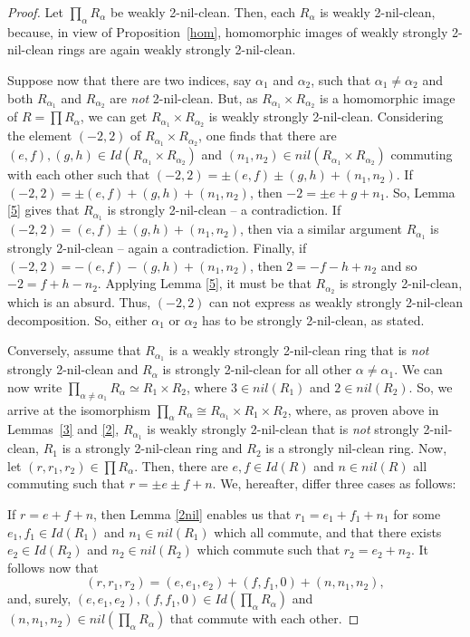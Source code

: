 \documentclass[12pt]{amsart}
\theoremstyle{definition}
\begin{document}
\begin{proof} Let $\prod_{\alpha} R_{\alpha}$ be weakly 2-nil-clean. Then, each $R_{\alpha}$ is weakly 2-nil-clean, because, in view of Proposition~\ref{hom}, homomorphic images of weakly strongly 2-nil-clean rings are again weakly strongly 2-nil-clean.

Suppose now that there are two indices, say $\alpha_1$ and $\alpha_2$, such that $\alpha_1\neq \alpha_2$ and both $R_{\alpha_1}$ and $R_{\alpha_2}$ are {\it not} 2-nil-clean. But, as $R_{\alpha_1}\times R_{\alpha_2}$ is a homomorphic image of $R = \prod R_{\alpha}$, we can get $R_{\alpha_1}\times R_{\alpha_2}$ is weakly strongly 2-nil-clean. Considering the element $(-2,2)$ of $R_{\alpha_1}\times R_{\alpha_2}$, one finds that there are $(e,f),(g,h)\in Id(R_{\alpha_1}\times R_{\alpha_2})$ and $(n_1,n_2)\in nil(R_{\alpha_1}\times R_{\alpha_2})$ commuting with each other such that $(-2,2)=\pm(e,f)\pm (g,h)+(n_1,n_2)$. If $(-2,2)=\pm(e,f)+ (g,h)+(n_1,n_2)$, then $-2=\pm e+g+n_1$. So, Lemma \ref{5} gives that $R_{\alpha_1}$ is strongly 2-nil-clean -- a contradiction. If $(-2,2)=(e,f)\pm (g,h)+(n_1,n_2)$, then via a similar argument $R_{\alpha_1}$ is strongly 2-nil-clean -- again a contradiction. Finally, if $(-2,2)=-(e,f)- (g,h)+(n_1,n_2)$, then $2=-f-h+n_2$ and so $-2=f+h-n_2$. Applying Lemma \ref{5}, it must be that $R_{\alpha_2}$ is strongly 2-nil-clean, which is an absurd. Thus, $(-2,2)$ can not express as weakly strongly 2-nil-clean decomposition. So, either $\alpha_1$ or $\alpha_2 $ has to be strongly 2-nil-clean, as stated.

Conversely, assume that $R_{{\alpha}_1}$ is a weakly strongly 2-nil-clean ring that is {\it not} strongly 2-nil-clean and $R_{\alpha}$ is strongly 2-nil-clean for all other $\alpha\neq \alpha_1$. We can now write $\prod_{\alpha\neq \alpha_1} R_{\alpha}\simeq R_1\times R_2$, where $3\in nil(R_1)$ and $2\in nil(R_2)$. So, we arrive at the isomorphism $\prod_{\alpha} R_{\alpha}\cong R_{\alpha_1}\times R_1\times R_2$, where, as proven above in Lemmas~\ref{3} and \ref{2}, $R_{\alpha_1}$ is weakly strongly 2-nil-clean that is {\it not} strongly 2-nil-clean, $R_1$ is a strongly 2-nil-clean ring and $R_2$ is a strongly nil-clean ring. Now, let $(r,r_1,r_2)\in\prod R_{\alpha}$. Then, there are $e,f\in Id(R)$ and $n\in nil(R)$ all commuting such that $r=\pm e\pm f+n$. We, hereafter, differ three cases as follows:

\medskip

 If $r=e+f+n$, then Lemma \ref{2nil} enables us that $r_1=e_1+f_1+n_1$ for some $e_1,f_1\in Id(R_1)$ and $n_1\in nil(R_1)$ which all commute, and that there exists $e_2\in Id(R_2)$ and $n_2\in nil(R_2)$ which commute such that $r_2=e_2+n_2$. It follows now that $$(r,r_1,r_2)=(e,e_1,e_2)+(f,f_1,0)+(n,n_1,n_2),$$ and, surely, $(e,e_1,e_2),(f,f_1,0)\in Id(\prod_{\alpha} R_{\alpha})$ and $(n,n_1,n_2)\in nil(\prod_{\alpha} R_{\alpha})$ that commute with each other.


\end{proof}
\end{document}
